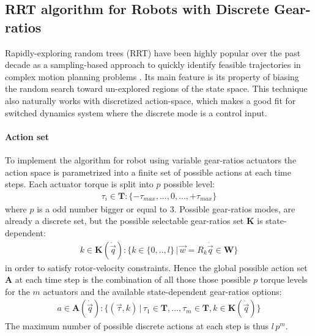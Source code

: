 \subsection{RRT algorithm for Robots with Discrete Gear-ratios}

Rapidly-exploring random trees (RRT) have been highly popular over the past decade as a sampling-based approach to quickly identify feasible trajectories in complex motion planning problems \cite{lavalle_rapidly-exploring_1998}\cite{lavalle_planning_2006}. Its main feature is its property of biasing the random search toward un-explored regions of the state space. This technique also naturally works with discretized action-space, which makes a good fit for switched dynamics system where the discrete mode is a control input.


\paragraph{Action set}
%
To implement the algorithm for robot using variable gear-ratios actuators the action space is parametrized into a finite set of possible actions at each time steps. Each actuator torque is split into $p$ possible level:
%
\begin{align}
\tau_i  \in \boldsymbol{T} : \{ -\tau_{max} , ... , 0 , ... , +\tau_{max} \}
\end{align}
%
where $p$ is a odd number bigger or equal to 3. Possible gear-ratios modes, are already a discrete set, but the possible selectable gear-ratios set $\boldsymbol{K}$ is state-dependent:
%
\begin{align}
k \in \boldsymbol{K}(\dot{\vec{q}}) : \big\{ k \in \{0,..,l\} \,|\, \vec{w} = R_k \dot{\vec{q}} \in \boldsymbol{W} \big\}
\end{align}
%
in order to satisfy rotor-velocity constraints. Hence the global possible action set $\boldsymbol{A}$ at each time step is the combination of all those those possible $p$ torque levels for the $m$ actuators and the available state-dependent gear-ratios options:
%
\begin{align}
a \in \boldsymbol{A}(\dot{\vec{q}}) : \big\{ \left( \vec{\tau} , k \right) \,|\, \tau_1  \in \boldsymbol{T}  , ...  ,  \tau_m  \in \boldsymbol{T} ,  k \in \boldsymbol{K}(\dot{\vec{q}})  \big\}
\end{align}
%
The maximum number of possible discrete actions at each step is thus $l\,p^m$.


